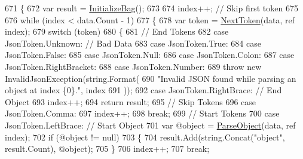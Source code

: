 \begin{DoxyCode}
671         \{
672             var result = \hyperlink{a00046_a9f62c2e79312364d7161b13a64b89c8e}{InitializeBag}();
673 
674             index++; \textcolor{comment}{// Skip first token}
675 
676             \textcolor{keywordflow}{while} (index < data.Count - 1)
677             \{
678                 var token = \hyperlink{a00046_a1d2daab9b052b186da7a2b6711be5803}{NextToken}(data, ref index);
679                 \textcolor{keywordflow}{switch} (token)
680                 \{
681                     \textcolor{comment}{// End Tokens}
682                     \textcolor{keywordflow}{case} JsonToken.Unknown:             \textcolor{comment}{// Bad Data}
683                     \textcolor{keywordflow}{case} JsonToken.True:
684                     \textcolor{keywordflow}{case} JsonToken.False:
685                     \textcolor{keywordflow}{case} JsonToken.Null:
686                     \textcolor{keywordflow}{case} JsonToken.Colon:
687                     \textcolor{keywordflow}{case} JsonToken.RightBracket:
688                     \textcolor{keywordflow}{case} JsonToken.Number:
689                         \textcolor{keywordflow}{throw} \textcolor{keyword}{new} InvalidJsonException(\textcolor{keywordtype}{string}.Format(
690                             \textcolor{stringliteral}{"Invalid JSON found while parsing an object at index \{0\}."}, index
691                             ));
692                     \textcolor{keywordflow}{case} JsonToken.RightBrace:          \textcolor{comment}{// End Object}
693                         index++;
694                         \textcolor{keywordflow}{return} result;
695                     \textcolor{comment}{// Skip Tokens}
696                     \textcolor{keywordflow}{case} JsonToken.Comma:
697                         index++;
698                         \textcolor{keywordflow}{break};
699                     \textcolor{comment}{// Start Tokens}
700                     \textcolor{keywordflow}{case} JsonToken.LeftBrace:           \textcolor{comment}{// Start Object}
701                         var @\textcolor{keywordtype}{object} = \hyperlink{a00046_a49577a43cf31e147b6d46ea28f7f617e}{ParseObject}(data, ref index);
702                         \textcolor{keywordflow}{if} (@\textcolor{keywordtype}{object} != null)
703                         \{
704                             result.Add(string.Concat(\textcolor{stringliteral}{"object"}, result.Count), @\textcolor{keywordtype}{object});
705                         \}
706                         index++;
707                         \textcolor{keywordflow}{break};

\end{DoxyCode}
